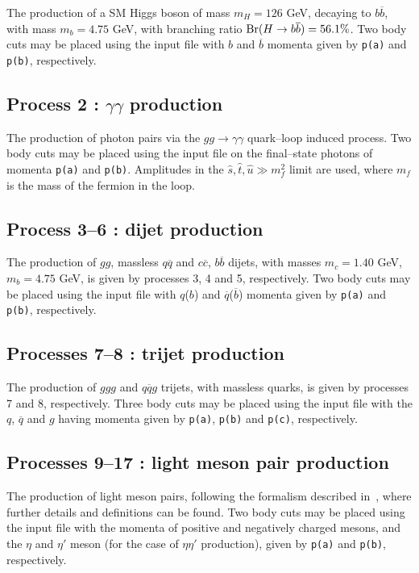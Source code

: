 \documentclass[12pt]{article}
\begin{document}
The production of a SM Higgs boson of mass $m_H=126$ GeV, decaying to $b\overline{b}$, with mass $m_b=4.75$ GeV, with branching ratio 
${\rm Br}(H\to b\overline{b})=56.1\%$. Two body cuts may be placed using the input file with $b$ and $\overline{b}$ momenta given by 
\texttt{p(a)} and \texttt{p(b)}, respectively.

\subsection{Process 2 : $\gamma\gamma$ production}

The production of photon pairs via the $gg\to\gamma\gamma$ quark--loop induced process. Two body cuts may be placed using the input file on the 
final--state photons of momenta  \texttt{p(a)} and \texttt{p(b)}.  Amplitudes in the $\hat{s},\hat{t},\hat{u} \gg m_f^2$ limit are used, where 
$m_f$ is the mass of the fermion in the loop.

\subsection{Process 3--6 : dijet production}

The production of $gg$, massless $q\overline{q}$ and $c\overline{c}$, $b\overline{b}$ dijets, with masses $m_c=1.40$ GeV, $m_b=4.75$ GeV, is given
 by processes 3, 4 and 5, respectively. Two body cuts may be placed using the input file with $q$($b$) and $\overline{q}$($\overline{b}$) momenta 
 given by \texttt{p(a)} and \texttt{p(b)}, respectively.

\subsection{Processes 7--8 : trijet production}

The production of $ggg$ and $q\overline{q}g$ trijets, with massless quarks, is given by processes 7 and 8, respectively. Three body cuts may be 
placed using the input file with the $q$, $\overline{q}$ and $g$ having momenta given by \texttt{p(a)}, \texttt{p(b)} and \texttt{p(c)}, respectively.

\subsection{Processes 9--17 : light meson pair production}

The production of light meson pairs, following the formalism described in~\cite{HarlandLang:2011qd,Harland-Lang:2013ncy}, where further details and 
definitions can be found. Two body cuts may be placed using the input file with the momenta of  positive and negatively charged mesons, and the 
$\eta$ and $\eta'$ meson (for the case of $\eta\eta'$ production), given by  \texttt{p(a)} and \texttt{p(b)}, respectively.
\end{document}
